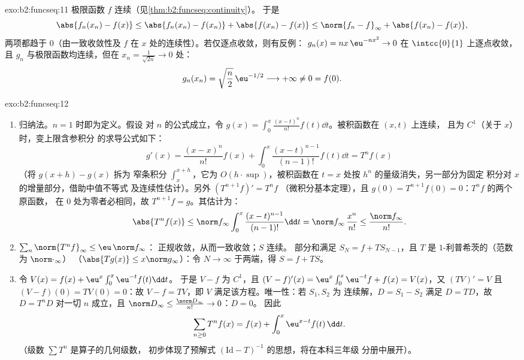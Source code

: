 \begin{solution}{exo:b2:funcseq:11}
极限函数 $f$ 连续（见\cref{thm:b2:funcseq:continuity}）。
于是
\[
\abs{f_n(x_n) - f(x)}
\leq \abs{f_n(x_n) - f(x_n)} + \abs{f(x_n) - f(x)}
\leq \norm{f_n - f}_\infty + \abs{f(x_n) - f(x)} ,
\]
两项都趋于 $0$（由一致收敛性及
$f$ 在 $x$ 处的连续性）。若仅逐点收敛，则有反例：
$g_n(x) = nx\,\eu^{-nx^2} \to 0$ 在 $\intcc{0}{1}$ 上逐点收敛，
且 $g_n$ 与极限函数均连续，但在 $x_n =
\frac{1}{\sqrt{2n}} \to 0$ 处：
\[
g_n(x_n) = \sqrt{\frac n2}\,\eu^{-1/2} \longrightarrow +\infty
\neq 0 = f(0) .
\]
\end{solution}

\begin{solution}{exo:b2:funcseq:12}
\begin{enumerate}
  \item 归纳法。$n = 1$ 时即为定义。假设
        对 $n$ 的公式成立，令 $g(x) = \int_0^x \frac{(x-t)^n}{n!}
        f(t)\dd t$。被积函数在 $(x,t)$ 上连续，
        且为 $C^1$（关于 $x$）时，变上限含参积分
        的求导公式如下：
        \[
        g'(x) = \frac{(x-x)^n}{n!}f(x)
        + \int_0^x \frac{(x-t)^{n-1}}{(n-1)!}f(t)\dd t
        = T^nf(x)
        \]
        （将 $g(x+h) - g(x)$ 拆为
        窄条积分 $\int_x^{x+h}$，它为 $O(h\cdot\sup)$，被积函数在
        $t = x$ 处按 $h^n$ 的量级消失，另一部分为固定
        积分对 $x$ 的增量部分，借助中值不等式
        及连续性估计）。另外 $(T^{n+1}f)' = T^nf$
        （微积分基本定理），且 $g(0) =
        T^{n+1}f(0) = 0$：$T^nf$ 的两个原函数，
        在 $0$ 处为零者必相同，故 $T^{n+1}f = g$。其估计为：
        \[
        \abs{T^nf(x)} \leq \norm f_\infty
        \int_0^x \frac{(x-t)^{n-1}}{(n-1)!}\dd t
        = \norm f_\infty\,\frac{x^n}{n!}
        \leq \frac{\norm f_\infty}{n!} .
        \]
  \item $\sum_n \norm{T^nf}_\infty \leq \eu\,\norm f_\infty$：
        正规收敛，从而一致收敛；$S$ 连续。
        部分和满足 $S_N = f + T S_{N-1}$，且 $T$
        是 $1$-利普希茨的（范数为 $\norm\cdot_\infty$）
        （$\abs{Tg(x)} \leq x\norm g_\infty$）：令 $N \to
        \infty$ 于两端，得 $S = f + TS$。
  \item 令 $V(x) = f(x) + \eu^x\int_0^x \eu^{-t}f(t)\dd t$。
        于是 $V - f$ 为 $C^1$，且 $(V-f)'(x) =
        \eu^x\int_0^x\eu^{-t}f + f(x) = V(x)$，又 $(TV)' = V$
        且 $(V - f)(0) = TV(0) = 0$：故 $V - f = TV$，即
        $V$ 满足该方程。唯一性：若 $S_1, S_2$ 为
        连续解，$D = S_1 - S_2$ 满足 $D =
        TD$，故 $D = T^nD$ 对一切 $n$ 成立，且 $\norm D_\infty
        \leq \frac{\norm D_\infty}{n!} \to 0$：$D = 0$。
        因此
        \[
        \sum_{n\geq0} T^nf(x) = f(x) +
        \int_0^x \eu^{x-t}f(t)\,\dd t .
        \]
        （级数 $\sum T^n$ 是算子的几何级数，
        初步体现了预解式
        $(\mathrm{Id} - T)^{-1}$ 的思想，将在本科三年级
        分册中展开）。
\end{enumerate}
\end{solution}

